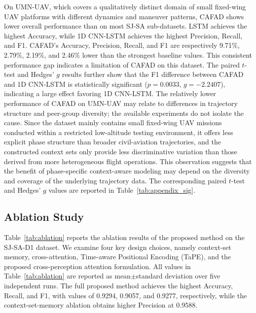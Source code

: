 \documentclass[iicol,pdflatex,sn-basic,Numbered]{sn-jnl}%
\theoremstyle{thmstyleone}%
\theoremstyle{thmstyletwo}%
\theoremstyle{thmstylethree}%
\begin{document}
On UMN-UAV, which covers a qualitatively distinct domain of small fixed-wing UAV platforms with different dynamics and maneuver patterns, CAFAD shows lower overall performance than on most SJ-SA sub-datasets.
LSTM achieves the highest Accuracy, while 1D CNN-LSTM achieves the highest Precision, Recall, and F1.
CAFAD's Accuracy, Precision, Recall, and F1 are respectively 9.71\%, 2.79\%, 2.19\%, and 2.46\% lower than the strongest baseline values.
This consistent performance gap indicates a limitation of CAFAD on this dataset.
The paired $t$-test and Hedges' $g$ results further show that the F1 difference between CAFAD and 1D CNN-LSTM is statistically significant ($p=0.0033$, $g=-2.2407$), indicating a large effect favoring 1D CNN-LSTM.
The relatively lower performance of CAFAD on UMN-UAV may relate to differences in trajectory structure and peer-group diversity; the available experiments do not isolate the cause.
Since the dataset mainly contains small fixed-wing UAV missions conducted within a restricted low-altitude testing environment, it offers less explicit phase structure than broader civil-aviation trajectories, and the constructed context sets only provide less discriminative variation than those derived from more heterogeneous flight operations.
This observation suggests that the benefit of phase-specific context-aware modeling may depend on the diversity and coverage of the underlying trajectory data.
The corresponding paired $t$-test and Hedges' $g$ values are reported in Table~\ref{tab:appendix_sig}.


\subsection{Ablation Study}
\label{sec:ablation}

Table~\ref{tab:ablation} reports the ablation results of the proposed method on the SJ-SA-D1 dataset.
We examine four key design choices, namely context-set memory, cross-attention, Time-aware Positional Encoding (TaPE), and the proposed cross-perception attention formulation.
All values in Table~\ref{tab:ablation} are reported as mean$\pm$standard deviation over five independent runs.
The full proposed method achieves the highest Accuracy, Recall, and F1, with values of 0.9294, 0.9057, and 0.9277, respectively, while the context-set-memory ablation obtains higher Precision at 0.9588.
\end{document}
